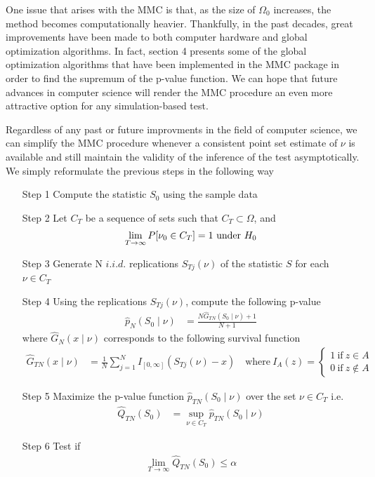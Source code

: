\documentclass[11pt]{article}\usepackage[]{graphicx}\usepackage[]{color}
\newcommand{\pkg}[1]{{\normalfont\fontseries{b}\selectfont #1}}
\begin{document}
One issue that arises with the MMC is that, as the size of $\Omega_0$ increases, the method becomes computationally heavier. Thankfully, in the past decades, great improvements have been made to both computer hardware and global optimization algorithms. In fact, section 4 presents some of the global optimization algorithms that have been implemented in the \pkg{MMC} package in order to find the supremum of the p-value function. We can hope that future advances in computer science will render the MMC procedure an even more attractive option for any simulation-based test.

Regardless of any past or future improvments in the field of computer science, we can simplify the MMC procedure whenever a consistent point set estimate of $\nu$ is available and still maintain the validity of the inference of the test asymptotically. We simply reformulate the previous steps in the following way
\begin{itemize}
	\item[Step 1] Compute the statistic $S_0$ using the sample data
	\item[Step 2] Let $C_T$ be a sequence of sets such that $C_T \subset \Omega$, and
	\begin{align}
	\label{eq:consistent}
	\lim\limits_{T \rightarrow \infty}P[\nu_0 \in C_T] = 1 \textnormal{ under } H_0
	\end{align}
	\item[Step 3] Generate N $i.i.d.$ replications $S_{Tj}(\nu)$ of the statistic $S$ for each $\nu \in C_T$
	\item[Step 4] Using the replications $S_{Tj}(\nu)$, compute the following p-value
	\begin{align}
	\hat{p}_{N}(S_{0} \mid \nu) & = \frac{N\hat{G}_{TN}(S_{0} \mid \nu)+1}{N+1}
	\end{align}
	where $\hat{G}_{N}(x \mid \nu)$ corresponds to the following survival function
	\begin{align}
	\hat{G}_{TN}(x \mid \nu) & =\frac{1}{N}\sum_{j=1}^{N}I_{[0,\infty]}(S_{Tj}(\nu)-x) \quad \mathrm{where} \ I_{A}(z)=\left\{\begin{array}{l}
	1\ \mathrm{if}\ z\in A\\
	0\ \mathrm{if}\ z\not\in A
	\end{array}\right.
	\end{align}

	\item[Step 5] Maximize the p-value function $\hat{p}_{TN}(S_{0} \mid \nu)$ over the set $\nu \in C_T$ i.e.
	\begin{align}
	\hat{Q}_{TN}(S_0) & = \sup_{\nu \in C_T} \hat{p}_{TN}(S_{0} \mid \nu)
	\end{align}

	\item[Step 6] Test if
	\begin{align}
	\lim\limits_{T \rightarrow \infty}\hat{Q}_{TN}(S_{0})\leq \alpha
	\end{align}
\end{itemize}
\end{document}

